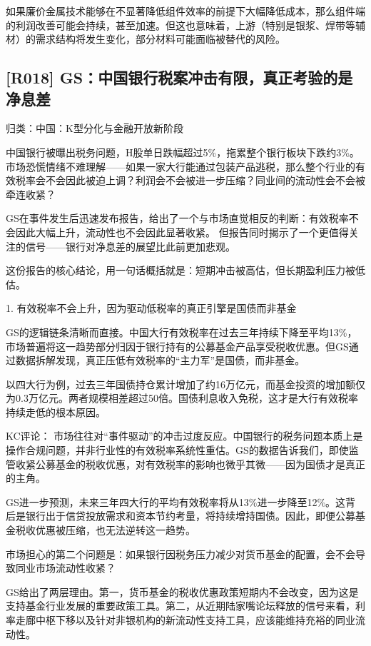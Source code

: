 \documentclass[11pt]{ctexart}
\begin{document}
如果廉价金属技术能够在不显著降低组件效率的前提下大幅降低成本，那么组件端的利润改善可能会持续，甚至加速。但这也意味着，上游（特别是银浆、焊带等辅材）的需求结构将发生变化，部分材料可能面临被替代的风险。

\subsection{[R018] GS：中国银行税案冲击有限，真正考验的是净息差}
{\small\color{refgray}归类：中国：K型分化与金融开放新阶段}

中国银行被曝出税务问题，H股单日跌幅超过5\%，拖累整个银行板块下跌约3\%。市场恐慌情绪不难理解——如果一家大行能通过包装产品逃税，那么整个行业的有效税率会不会因此被迫上调？利润会不会被进一步压缩？同业间的流动性会不会被牵连收紧？

GS在事件发生后迅速发布报告，给出了一个与市场直觉相反的判断：有效税率不会因此大幅上升，流动性也不会因此显著收紧。 但报告同时揭示了一个更值得关注的信号——银行对净息差的展望比此前更加悲观。

这份报告的核心结论，用一句话概括就是：短期冲击被高估，但长期盈利压力被低估。

1. 有效税率不会上升，因为驱动低税率的真正引擎是国债而非基金

GS的逻辑链条清晰而直接。中国大行有效税率在过去三年持续下降至平均13\%，市场普遍将这一趋势部分归因于银行持有的公募基金产品享受税收优惠。但GS通过数据拆解发现，真正压低有效税率的“主力军”是国债，而非基金。

以四大行为例，过去三年国债持仓累计增加了约16万亿元，而基金投资的增加额仅为0.3万亿元。两者规模相差超过50倍。国债利息收入免税，这才是大行有效税率持续走低的根本原因。

KC评论： 市场往往对“事件驱动”的冲击过度反应。中国银行的税务问题本质上是操作合规问题，并非行业性的有效税率系统性重估。GS的数据告诉我们，即使监管收紧公募基金的税收优惠，对有效税率的影响也微乎其微——因为国债才是真正的主角。

GS进一步预测，未来三年四大行的平均有效税率将从13\%进一步降至12\%。这背后是银行出于信贷投放需求和资本节约考量，将持续增持国债。因此，即便公募基金税收优惠被压缩，也无法逆转这一趋势。

市场担心的第二个问题是：如果银行因税务压力减少对货币基金的配置，会不会导致同业市场流动性收紧？

GS给出了两层理由。第一，货币基金的税收优惠政策短期内不会改变，因为这是支持基金行业发展的重要政策工具。第二，从近期陆家嘴论坛释放的信号来看，利率走廊中枢下移以及针对非银机构的新流动性支持工具，应该能维持充裕的同业流动性。
\end{document}
